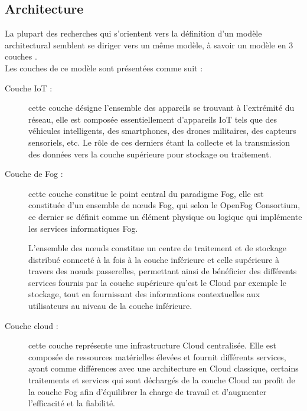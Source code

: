 \subsection{Architecture}
La plupart des recherches qui s'orientent vers la définition d'un modèle architectural semblent se diriger vers un même modèle, à savoir un modèle en 3 couches \cite{de2019}.\\
Les couches de ce modèle sont présentées comme suit :
\begin{description}
  \item[Couche IoT :] cette couche désigne l'ensemble des appareils se trouvant à l'extrémité du réseau, elle est composée essentiellement d'appareils IoT tels que des véhicules intelligents, des smartphones, des drones militaires, des capteurs sensoriels, etc. Le rôle de ces derniers étant la collecte et la transmission des données vers la couche supérieure pour stockage ou traitement.
  \item[Couche de Fog :] cette couche constitue le point central du paradigme Fog, elle est constituée d'un ensemble de nœuds Fog, qui selon le OpenFog Consortium, ce dernier se définit comme 
  \og{}un élément physique ou logique qui implémente les services informatiques Fog\fg\cite{de2019}.\par
  L'ensemble des nœuds constitue un centre de traitement et de stockage distribué connecté à la fois à la couche inférieure et celle supérieure à travers des nœuds passerelles, permettant ainsi de bénéficier des différents services fournis par la couche supérieure qu'est le Cloud par exemple le stockage, tout en fournissant des informations contextuelles aux utilisateurs au niveau de la couche inférieure.
  \item[Couche cloud :] cette couche représente une infrastructure Cloud centralisée. Elle est composée de ressources matérielles élevées et fournit différents services, ayant comme différences avec une architecture en Cloud classique, certains traitements et services qui sont déchargés de la couche Cloud au profit de la couche Fog afin d'équilibrer la charge de travail et d'augmenter l'efficacité et la fiabilité.
\end{description}

